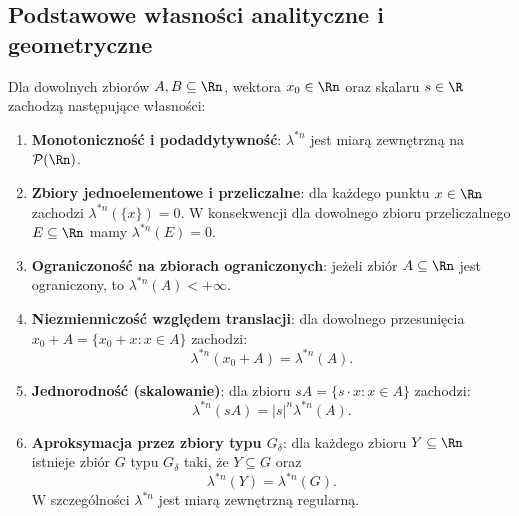 \subsection{Podstawowe własności analityczne i geometryczne}
\begin{tw}\label{tw:wlasnosci_zewn}
    Dla dowolnych zbiorów $A, B \subseteq \Rn$, wektora $x_0 \in \Rn$ oraz skalaru $s \in \R$ zachodzą następujące własności:
    \begin{enumerate}
        \item \textbf{Monotoniczność i podaddytywność}: $\lambda^{*n}$ jest miarą zewnętrzną na $\mathcal{P}(\Rn)$.
        \item \textbf{Zbiory jednoelementowe i przeliczalne}: dla każdego punktu $x \in \Rn$ zachodzi $\lambda^{*n}(\{x\}) = 0$. W konsekwencji dla dowolnego zbioru przeliczalnego $E \subseteq \Rn$ mamy $\lambda^{*n}(E) = 0$.
        \item \textbf{Ograniczoność na zbiorach ograniczonych}: jeżeli zbiór $A \subseteq \Rn$ jest ograniczony, to $\lambda^{*n}(A) < +\infty$.

        \item \textbf{Niezmienniczość względem translacji}: dla dowolnego przesunięcia $x_0 + A = \{x_0 + x \colon x \in A\}$ zachodzi:
              \begin{equation*}
                  \lambda^{*n}(x_0 + A) = \lambda^{*n}(A).
              \end{equation*}
        \item \textbf{Jednorodność (skalowanie)}: dla zbioru $sA = \{s \cdot x \colon x \in A\}$ zachodzi:
              \begin{equation*}
                  \lambda^{*n}(sA) = |s|^n \lambda^{*n}(A).
              \end{equation*}
        \item \textbf{Aproksymacja przez zbiory typu $G_\delta$}: dla każdego zbioru $Y \subseteq \Rn$ istnieje zbiór $G$ typu $G_\delta$ taki, że $Y \subseteq G$ oraz
              \begin{equation*}
                  \lambda^{*n}(Y) = \lambda^{*n}(G).
              \end{equation*}
              W szczególności $\lambda^{*n}$ jest miarą zewnętrzną regularną. \end{enumerate}
\end{tw}
